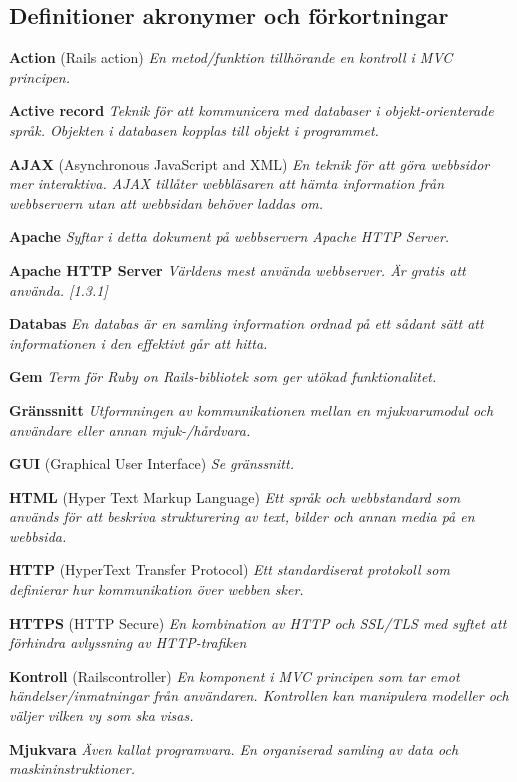 \documentclass[a4paper, twoside, 11pt, titlepage]{article}
\begin{document}
	\subsection{Definitioner akronymer och förkortningar}


	\textbf{Action} (Rails action) \emph{En metod/funktion tillhörande en kontroll i MVC principen.}

	\textbf{Active record} \emph{Teknik för att kommunicera med databaser i objekt-orienterade språk. Objekten i databasen kopplas till objekt i programmet.}

	\textbf{AJAX} (Asynchronous JavaScript and XML) \emph{En teknik för att göra webbsidor mer interaktiva. AJAX tillåter webbläsaren att hämta information från webbservern utan att webbsidan behöver laddas om.}

	\textbf{Apache} \emph{Syftar i detta dokument på webbservern Apache HTTP Server.}

	\textbf{Apache HTTP Server} \emph{Världens mest använda webbserver. Är gratis att använda. [1.3.1]}

	\textbf{Databas} \emph{En databas är en samling information ordnad på ett sådant sätt att informationen i den effektivt går att hitta.}

	\textbf{Gem} \emph{Term för Ruby on Rails-bibliotek som ger utökad funktionalitet.}

	\textbf{Gränssnitt} \emph{Utformningen av kommunikationen mellan en mjukvarumodul och användare eller annan mjuk-/hårdvara.}

	\textbf{GUI} (Graphical User Interface) \emph{Se gränssnitt.}

	\textbf{HTML} (Hyper Text Markup Language) \emph{Ett språk och webbstandard som används för att beskriva strukturering av text, bilder och annan media på en webbsida.}

	\textbf{HTTP} (HyperText Transfer Protocol) \emph{Ett standardiserat protokoll som definierar hur kommunikation över webben sker.}

	\textbf{HTTPS} (HTTP Secure) \emph{En kombination av HTTP och SSL/TLS med syftet att förhindra avlyssning av HTTP-trafiken}

	\textbf{Kontroll} (Railscontroller) \emph{En komponent i MVC principen som tar emot händelser/inmatningar från användaren. Kontrollen kan manipulera modeller och väljer vilken vy som ska visas.}

	\textbf{Mjukvara} \emph{Även kallat programvara. En organiserad samling av data och maskininstruktioner.}
\end{document}
